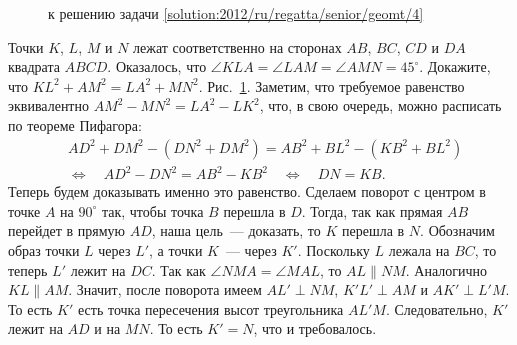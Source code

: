 \ifsolution
\begin{figure}\centering
    \caption{к решению задачи \ref{solution:2012/ru/regatta/senior/geomt/4}}
    \label{fig:solution:2012/ru/regatta/senior/geomt/4}
\end{figure}
\fi %

\problem
Точки $K$, $L$, $M$ и $N$ лежат соответственно на сторонах
$AB$, $BC$, $CD$ и $DA$ квадрата $ABCD$.
Оказалось, что $\angle KLA = \angle LAM = \angle AMN = 45^\circ$.
Докажите, что $KL^2 + AM^2 = LA^2 + MN^2$.
\solution
\label{solution:2012/ru/regatta/senior/geomt/4}%
Рис.~\ref{fig:solution:2012/ru/regatta/senior/geomt/4}.
Заметим, что требуемое равенство эквивалентно
$AM^2 - MN^2 = LA^2 - LK^2$,
что, в свою очередь, можно расписать по теореме Пифагора:
\begin{align*}
&
    AD^2 + DM^2 - (DN^2 + DM^2) = AB^2 + BL^2 - (KB^2 + BL^2)
\\&\Leftrightarrow\quad
    AD^2 - DN^2 = AB^2 - KB^2
\quad\Leftrightarrow\quad
    DN = KB
.\end{align*}
Теперь будем доказывать именно это равенство.
Сделаем поворот с центром в точке $A$ на $90^\circ$ так, чтобы точка $B$
перешла в $D$.
Тогда, так как прямая $AB$ перейдет в прямую $AD$, наша цель~--- доказать, то
$K$ перешла в $N$.
Обозначим образ точки $L$ через $L'$, а точки $K$~--- через $K'$.
Поскольку $L$ лежала на $BC$, то теперь $L'$ лежит на $DC$.
Так как $\angle NMA = \angle MAL$, то $AL \parallel NM$.
Аналогично $KL \parallel AM$.
Значит, после поворота имеем
$AL' \perp NM$, $K'L' \perp AM$ и $AK' \perp L'M$.
То есть $K'$ есть точка пересечения высот треугольника $AL'M$.
Следовательно, $K'$ лежит на $AD$ и на $MN$.
То есть $K' = N$, что и требовалось.
\endproblem
